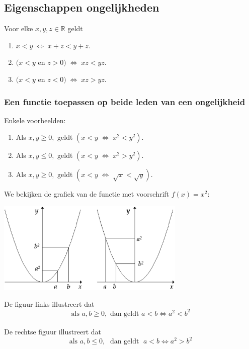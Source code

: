 \documentclass[11pt]{article}
\newcommand{\RR}{\ensuremath{\mathbb{R}}}
\begin{document}
{\subsection{Eigenschappen ongelijkheden}
 Voor elke $x,y,z \in\RR $ geldt
\begin{enumerate}
\item \label{opt}$x< y \;\Leftrightarrow \;x+z< y+z$.
\item\label{factor} $(x<y $ en $ \displaystyle z>
0)\; \Leftrightarrow \; xz< yz$.
\item \label{neg
factor}$(x< y $ en $ \displaystyle z<0)\; \Leftrightarrow \; xz>
yz$.
\end{enumerate}


\subsubsection*{Een functie toepassen op beide leden van een
ongelijkheid} Enkele voorbeelden:
\begin{enumerate}
\item \label{kwadraat pos}Als $x,y \geqslant 0,$ geldt $ (x< y \;
\Leftrightarrow \; x^{2}< y^{2})$.
\item \label{kwadraat neg}Als $x,y \leqslant 0,$ geldt $ (x<y \; \Leftrightarrow \;
x^{2}> y^{2})$.
\item \label{wortel} Als $x,y \geqslant 0,$ geldt $ (x< y \; \Leftrightarrow \; \sqrt{x}<\sqrt{y}).$

\end{enumerate}


We bekijken de grafiek van de functie met voorschrift $f(x) =x^2:$
\begin{center}

\includegraphics[width=9cm]{parabool2bis.ps}\end{center}

De figuur links illustreert dat
$$\mbox{als }a,b \geqslant 0, \mbox{ dan geldt } a<b\Leftrightarrow
a^2<b^2$$
\\De rechtse figuur  illustreert dat $$\mbox{als }a,b \leqslant 0, \;\mbox{ dan
geldt } \;a<b\Leftrightarrow a^2>b^2$$

}
\end{document}
